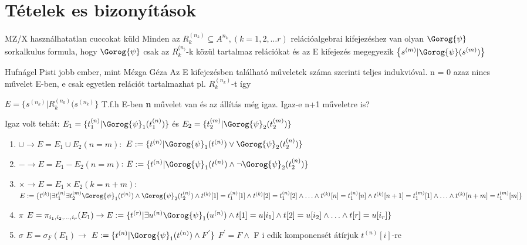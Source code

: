 \section{Tételek es bizonyítások}

\begin{tetel}{MZ/X használhatatlan cuccokat küld} Minden az $R_k^{(n_k)} \subseteq A^{n_k}, (k=1,2,\ldots r) $ relációalgebrai kifejezéshez van olyan $\Gorog{\psi}$ sorkalkulus formula, hogy $\Gorog{\psi}$ csak az $R_k^{(n_)}$-k közül tartalmaz relációkat és az E kifejezés megegyezik $\left\lbrace s^{ (m) } | \Gorog{\psi}(s^{ (m) })  \right\rbrace$
\end{tetel}

\begin{bizonyitas}{Hufnágel Pisti jobb ember, mint Mézga Géza}	Az E kifejezésben található műveletek száma szerinti teljes indukvióval. n = 0 azaz nincs művelet E-ben, e csak egyetlen relációt tartalmazhat pl. $R_k^{ (n_k) }$-t így

$E = \lbrace s^{ (n_k) } | R_k^{ (n_k) }(s^{ (n_k) } \rbrace$ \quad T.f.h E-ben \textbf{n} művelet van és az állítás még igaz. Igaz-e n+1 műveletre is?

Igaz volt tehát: $E_1 = \lbrace t_1^{ (n) } | \Gorog{\psi}_1(t_1^{ (n) } ) \rbrace$ és $E_2 = \lbrace t_2^{ (m) } | \Gorog{\psi}_2(t_2^{ (m) } ) \rbrace$
\begin{enumerate}
  \item $ \cup \rightarrow E = E_1 \cup E_2 (n = m) :  $ $E:= \lbrace t^{ (n) } | \Gorog{\psi}_1(t^{ (n) } ) \vee \Gorog{\psi}_2( t_2^{ ( n ) } ) \rbrace$
  \item $ - \rightarrow E = E_1-E_2 (n = m)$: $E:= \lbrace t^{ (n) } | \Gorog{\psi}_1(t^{ (n) } ) \land \neg \Gorog{\psi}_2( t_2^{ ( n ) } ) \rbrace$
  \item $\times \rightarrow E = E_1 \times E_2 (k = n+m):$ $E:= \lbrace t^{ (k) } | \exists t_1^{ (n) } \exists t_2^{ (m) }\Gorog{\psi}_1(t^{ (n) } ) \land \Gorog{\psi}_2(t_2^{ (n) }) \land t^{ (k) }[1] = t_1^{(n)}[1] \land t^{ (k) }[2] = t_1^{(n)}[2] \land \ldots \land t^{ (k) }[n] = t_1^{(n)}[n] \land t^{ (k) }[n+1] = t_1^{(m)}[1] \land \ldots \land t^{ (k) }[n+m] = t_1^{(m)}[m] \rbrace$
  \item $\pi$ $E = \pi_{i_1,i_2,\ldots ,i_r}(E_1) \rightarrow E:= \lbrace t^{ (r) } | \exists u^{ (n) } \Gorog{\psi}_1(u^{ (n) } ) \land  t[1] = u[i_1] \land t[2] = u[i_2] \land \ldots \land t[r] = u[i_r] \rbrace$
  \item $\sigma$ $ E = \sigma_F(E_1) \rightarrow$ $E:= \lbrace t^{ (n) } | \Gorog{\psi}_1(t^{ (n) } ) \land F^{'} \rbrace$  $F^{'} = F \land$ F i edik komponensét átírjuk $t^{ (n) }[i]$-re
\end{enumerate}
\end{bizonyitas}

